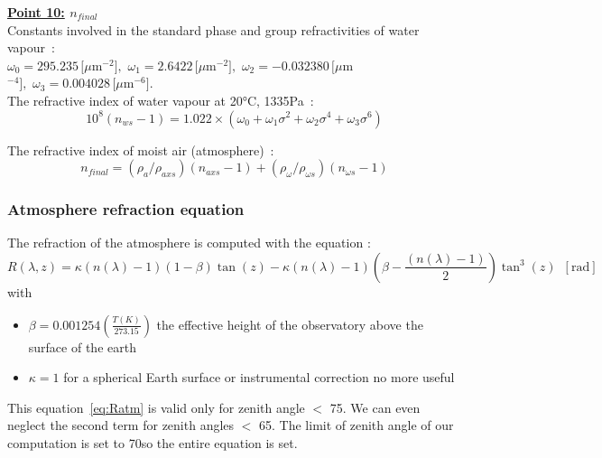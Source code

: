 \textbf{\underline{Point 10:} $n_{final}$}\\
Constants involved in the standard phase and group refractivities of water vapour~:\\
$\omega_0 = 295.235\,[\mu $m$^{-2}],\,\,\omega_1 = 2.6422\,[\mu $m$^{-2}],\,\,\omega_2 = -0.032380\,[\mu $m$^{-4}],\,\,\omega_3 = 0.004028\,[\mu$m$^{-6}]$.\\
The refractive index of water vapour at 20°C, 1335Pa~:
\begin{equation}
	10^8 \left(n_{ws}-1\right) = 1.022\times\left(\omega_0+\omega_1\sigma^2+\omega_2\sigma^4+\omega_3\sigma^6\right)
\end{equation}

The refractive index of moist air (atmosphere)~:
\begin{equation}
	n_{final} = \left(\rho_a / \rho_{axs}\right)\left(n_{axs}-1\right)+\left(\rho_\omega / \rho_{\omega s}\right)\left(n_{\omega s}-1\right)\label{eq:Ciddor_nprop}
\end{equation}



\subsubsection{Atmosphere refraction equation}
The refraction of the atmosphere is computed with the equation \cite{Stone1996}: 
\begin{equation}
	R(\lambda,z) = \kappa\left(n(\lambda)-1\right)\left(1-\beta\right)\tan(z) - \kappa\left(n(\lambda)-1\right)\left(\beta -\frac{\left(n(\lambda)-1\right)}{2}\right)\tan^3(z)\,\,\,[\text{rad}]\label{eq:Ratm}
\end{equation}
with 
\begin{itemize}
	\item $\beta = 0.001254\left(\frac{T(K)}{273.15}\right)$ the effective height of the observatory above the surface of the earth \cite{Stone1996}
	\item $\kappa = 1$ for a spherical Earth surface \cite{Stone1996} or instrumental correction no more useful \cite{Stone2002}
\end{itemize} 
This equation~\eqref{eq:Ratm} is valid only for zenith angle $<$ 75\degree. We can even neglect the second term for zenith angles $<$ 65\degree \cite{Tendulkar}. The limit of zenith angle of our computation is set to 70\degree so the entire equation is set.\\

